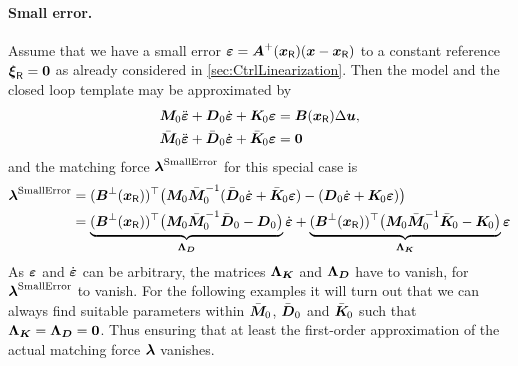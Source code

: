 \paragraph{Small error.}
Assume that we have a small error $\boldsymbol{\varepsilon} = \boldsymbol{A}^+(\boldsymbol{x}_{\mathsf{R}})(\boldsymbol{x}-\boldsymbol{x}_{\mathsf{R}})$ to a constant reference $\boldsymbol{\xi}_{\mathsf{R}}=\boldsymbol{0}$ as already considered in \autoref{sec:CtrlLinearization}.
Then the model and the closed loop template may be approximated by
\begin{subequations}
\begin{align}
 \boldsymbol{M}_{\!\text{0}} \ddot{\boldsymbol{\varepsilon}} + \boldsymbol{D}_{\text{0}} \dot{\boldsymbol{\varepsilon}} + \boldsymbol{K}_{\!\text{0}} \boldsymbol{\varepsilon} &= \boldsymbol{B}(\boldsymbol{x}_{\mathsf{R}}) \Delta \boldsymbol{u},
\\
 \bar{\boldsymbol{M}}_{\!\text{0}} \ddot{\boldsymbol{\varepsilon}} + \bar{\boldsymbol{D}}_{\text{0}} \dot{\boldsymbol{\varepsilon}} + \bar{\boldsymbol{K}}_{\!\text{0}} \boldsymbol{\varepsilon} &= \boldsymbol{0}
\end{align}
\end{subequations}
and the matching force $\boldsymbol{\lambda}^{\text{SmallError}}$ for this special case is
\begin{align}\label{eq:MatchingForceLin}
 \tuple{\lambda}^{\text{SmallError}} &= (\sysInputMatLComp(\sysCoordR))^\top \big( \sysInertiaMatLin \sysInertiaMatCLin^{-1} (\sysDissMatCLin \LinErrorCoordd + \sysStiffMatCLin \LinErrorCoord) - (\sysDissMatLin \LinErrorCoordd + \sysStiffMatLin \LinErrorCoord) \big)
\nonumber\\
 &= \underbrace{(\sysInputMatLComp(\sysCoordR))^\top \big( \sysInertiaMatLin \sysInertiaMatCLin^{-1} \sysDissMatCLin - \sysDissMatLin\big)}_{\mat{\Lambda}_{\sysDissMat}} \LinErrorCoordd
  + \underbrace{(\sysInputMatLComp(\sysCoordR))^\top \big( \sysInertiaMatLin \sysInertiaMatCLin^{-1} \sysStiffMatCLin - \sysStiffMatLin\big)}_{\mat{\Lambda}_{\sysStiffMat}} \LinErrorCoord
\end{align}
As $\boldsymbol{\varepsilon}$ and $\dot{\boldsymbol{\varepsilon}}$ can be arbitrary, the matrices $\boldsymbol{\Lambda}_{\boldsymbol{K}}$ and $\boldsymbol{\Lambda}_{\boldsymbol{D}}$ have to vanish, for $\boldsymbol{\lambda}^{\text{SmallError}}$ to vanish.
For the following examples it will turn out that we can always find suitable parameters within $\bar{\boldsymbol{M}}_{\!\text{0}}$, $\bar{\boldsymbol{D}}_{\text{0}}$ and $\bar{\boldsymbol{K}}_{\!\text{0}}$ such that $\boldsymbol{\Lambda}_{\boldsymbol{K}} = \boldsymbol{\Lambda}_{\boldsymbol{D}} = \boldsymbol{0}$.
Thus ensuring that at least the first-order approximation of the actual matching force $\boldsymbol{\lambda}$ vanishes.



